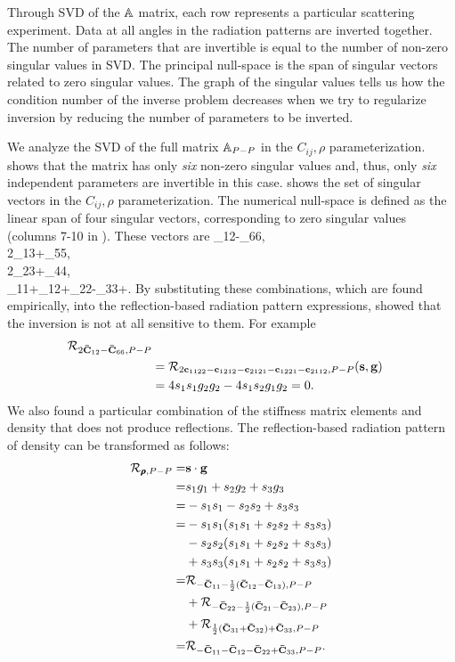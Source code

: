 Through SVD of the $\mathbb{A}$ matrix, each row represents a particular 
scattering experiment. Data at all angles in the radiation patterns are inverted 
together.
%
The number of parameters that are invertible is equal to the number of non-zero 
singular values in SVD.
%
The principal null-space is the span of singular vectors related to zero 
singular values. 
%
The graph of the singular values  tells us how the condition number of the 
inverse problem decreases when we try to regularize inversion by reducing the 
number of parameters to be inverted.

We analyze the SVD of the full matrix $\mathbb{A}_{P-P}$ in the 
$C_{ij},\rho$ parameterization.  shows that the 
matrix has only \emph{six} non-zero singular values and, thus, only \emph{six} 
independent parameters are invertible in this case. 
 shows the set of singular vectors in the 
$C_{ij},\rho$ parameterization. The numerical null-space is defined as the linear span of 
four singular vectors, corresponding to zero singular values (columns 7-10 in 
). 
These vectors are
\nmz{\Cv}_{12}-\nmz{\Cv}_{66}, \label{eq:C12C66}
\\
2\nmz{\Cv}_{13}+\nmz{\Cv}_{55},
\\
2\nmz{\Cv}_{23}+\nmz{\Cv}_{44},
\\
\nmz{\Cv}_{11}+\nmz{\Cv}_{12}+\nmz{\Cv}_{22}-\nmz{\Cv}_{33}+\nmz{\rhov}. 
\eeq
By substituting these combinations, which are found empirically, into the 
reflection-based radiation pattern expressions, \cite{kazei2018} showed that the inversion is not at all sensitive to them. 
For example
\begin{align}
\mathcal{R}_{2\mathbf{\bar{\text{$\mathbf{C}$}}}_{12}-\mathbf{\bar{\text{$\mathbf{C}$}}}_{66},P-P} \\ \nonumber
&= \mathcal{R}_{2\mathbf{c}_{1122}-\mathbf{c}_{1212}-\mathbf{c}_{2121}-\mathbf{c}_{1221}-\mathbf{c}_{2112},P-P}(\mathbf{s},\mathbf{g}) \\ \nonumber
&= 4 s_1s_1g_2g_2 - 4 s_1s_2g_1g_2 = 0.
\end{align}
%
We also found \citep{kazei2018} a particular combination of the stiffness matrix elements and density that does not produce reflections. The reflection-based radiation pattern of density can be transformed as follows:
\begin{align}
\mathcal{R}_{\pmb{\rho},P-P} =& \mathbf{s}\cdot\mathbf{g} \\ \nonumber
=& s_1g_1 + s_2g_2 + s_3g_3 \\ \nonumber
=& -s_1s_1-s_2s_2+s_3s_3 \\ \nonumber
=& -s_1s_1(s_1s_1+s_2s_2+s_3s_3) \\ \nonumber
&- s_2s_2(s_1s_1+s_2s_2+s_3s_3) \\ \nonumber
&+ s_3s_3(s_1s_1+s_2s_2+s_3s_3) \\ \nonumber
=& \mathcal{R}_{-\mathbf{\bar{\text{$\mathbf{C}$}}}_{11}-\frac{1}{2}(\mathbf{\bar{\text{$\mathbf{C}$}}}_{12}-\mathbf{\bar{\text{$\mathbf{C}$}}}_{13}),P-P} \\ \nonumber
&+ \mathcal{R}_{-\mathbf{\bar{\text{$\mathbf{C}$}}}_{22}-\frac{1}{2}(\mathbf{\bar{\text{$\mathbf{C}$}}}_{21}-\mathbf{\bar{\text{$\mathbf{C}$}}}_{23}),P-P} \\ \nonumber
&+ \mathcal{R}_{\frac{1}{2}(\mathbf{\bar{\text{$\mathbf{C}$}}}_{31}+\mathbf{\bar{\text{$\mathbf{C}$}}}_{32})+\mathbf{\bar{\text{$\mathbf{C}$}}}_{33},P-P} \\ \nonumber
=& \mathcal{R}_{-\mathbf{\bar{\text{$\mathbf{C}$}}}_{11}-\mathbf{\bar{\text{$\mathbf{C}$}}}_{12}-\mathbf{\bar{\text{$\mathbf{C}$}}}_{22}+\mathbf{\bar{\text{$\mathbf{C}$}}}_{33},P-P}.
\end{align}
